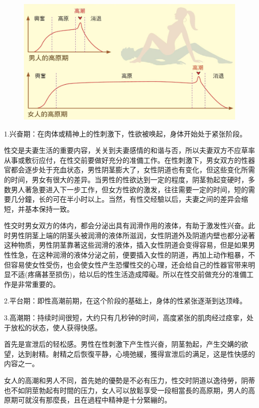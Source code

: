 \documentclass[12pt,UTF8]{ctexbook}
\begin{document}
\begin{figure}[htbp]
	\includegraphics[width=1\linewidth]{6}
	\caption{}
	\label{fig:1}
\end{figure}

1.兴奋期：在肉体或精神上的性刺激下，性欲被唤起，身体开始处于紧张阶段。

性交是夫妻生活的重要内容，关关到夫妻感情的和谐与否，所以夫妻双方不应草率从事或敷衍应付，在性交前要做好充分的准備工作。在性刺激下，男女双方的性器官都会逐步处于充血状态，男性阴茎膨大了，女性阴道也有变化，但这些变化所需的时间，男女有很大的差异。当男性的性欲达到一定的程度，阴茎勃起变硬时，多数男人著急要进入下一步工作，但女方性欲的激发，往往需要一定的时间，短的需要几分鐘，长的可在半小时以上。当然，有性交经驗以后，夫妻之间的差异会缩短，并基本保持一致。

性交时男女双方的体内，都会分泌出具有润滑作用的液体，有助于激发性兴奋。此时男性阴茎上端的阴茎头被润滑的液体所滋润，女性阴道外及阴道内壁也都分泌著这种物质，男性阴茎靠著这些润滑的液体，插入女性阴道会变得容易，但是如果男性性急，在这种润滑的液体分泌之前，便要插入女性的阴道，再加上动作粗暴，不但容易使女性受伤，也会使女性产生恐懼性交的心理，还会给自己的性器官带来明显不适(疼痛甚至损伤)，给以后的性生活造成障礙。所以在性交前做充分的准備工作是非常重要的。

2.平台期：即性高潮前期，在这个阶段的基础上，身体的性紧张逐渐到达顶峰。

3.高潮期：持续时间很短，大约只有几秒钟的时间，高度紧张的肌肉经过痉挛，处于放松的状态，使人获得快感。

首先是宣泄后的轻松感。男性在性刺激下产生性兴奋，阴茎勃起，产生交媾的欲望，达到射精。射精之后恢復平静，心境弛緩，獲得宣泄后的满足，这是性快感的内容之一。

女人的高潮和男人不同，首先她的優勢是不必有压力，性交时阴道以逸待勞，阴蒂也不如阴莖勃起有时間的压力，女人可以放鬆享受一段相當長的高原期，男人的高原期可就沒有那麼長，且在過程中精神是十分緊繃的。
\end{document}
